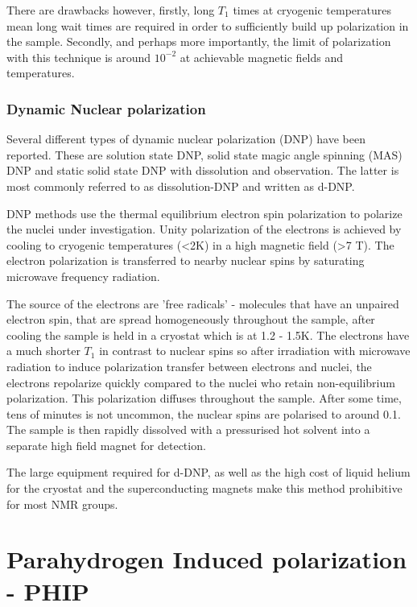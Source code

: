  There are drawbacks however, firstly, long $T_1$ times at cryogenic temperatures mean long
 wait times are required in order to sufficiently build up polarization in the sample. Secondly, and
 perhaps more importantly, the limit of polarization with this technique is around $10^{-2}$ at achievable
 magnetic fields and temperatures.

 \subsubsection{Dynamic Nuclear polarization}

 Several different types of dynamic nuclear polarization (DNP) have been reported. These are solution
 state DNP\citep{RN158}, solid state magic angle spinning (MAS) DNP\citep{RN159} and static solid state DNP with
 dissolution and observation\citep{RN160}. The latter is most commonly referred to as dissolution-DNP and written as d-DNP.

 DNP methods use the thermal equilibrium electron spin polarization to polarize the nuclei under investigation. Unity
 polarization of the electrons is achieved by cooling to cryogenic temperatures (<2K) in a high magnetic field (>7 T).
 The electron polarization is transferred to nearby nuclear spins by saturating microwave frequency radiation.

The source of the electrons are 'free radicals' - molecules that have an unpaired electron spin, that
are spread homogeneously throughout the sample, after cooling the sample is held in a cryostat which is at
1.2 - 1.5K. The electrons have a much shorter $T_1$ in contrast to nuclear spins so after irradiation with
microwave radiation to induce polarization transfer between electrons and nuclei, the electrons repolarize
quickly compared to the nuclei who retain non-equilibrium polarization. This polarization diffuses throughout the
sample. After some time, tens of minutes is not uncommon, the nuclear spins are polarised to around 0.1. The
sample is then rapidly dissolved with a pressurised hot solvent into a separate high field magnet for detection.

The large equipment required for d-DNP, as well as the high cost of liquid helium for the cryostat and
the superconducting magnets make this method  prohibitive for most NMR groups.

 \section{Parahydrogen Induced polarization - PHIP}

